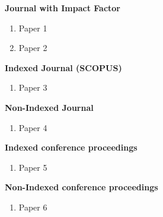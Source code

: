 \documentclass[oneside]{utmthesis}
\begin{document}

%



\listofpublications

\noindent \textbf{Journal with Impact Factor}
\begin{enumerate}
\item Paper 1
\item Paper 2
\end{enumerate}
\textbf{Indexed Journal (SCOPUS)}
\begin{enumerate}
\item Paper 3
\end{enumerate}
\noindent \textbf{Non-Indexed Journal}
\begin{enumerate}
\item Paper 4
\end{enumerate}
\noindent \textbf{Indexed conference proceedings}
\begin{enumerate}
\item Paper 5
\end{enumerate}
\noindent \textbf{Non-Indexed conference proceedings}
\begin{enumerate}
\item Paper 6
\end{enumerate}

\end{document}
